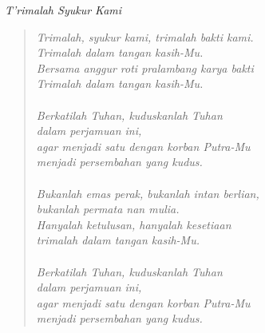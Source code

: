 \small
\begin{center}
\itshape{T’rimalah Syukur Kami}
\end{center}

\begin{verse}
\itshape{
Trimalah, syukur kami, trimalah bakti kami.\\
Trimalah dalam tangan kasih-Mu.\\
Bersama anggur roti pralambang karya bakti\\
Trimalah dalam tangan kasih-Mu.\\
{~}\\
Berkatilah Tuhan, kuduskanlah Tuhan\\
dalam perjamuan ini,\\
agar menjadi satu dengan korban Putra-Mu\\
menjadi persembahan yang kudus.\\
{~}\\
Bukanlah emas perak, bukanlah intan berlian,\\
bukanlah permata nan mulia.\\
Hanyalah ketulusan, hanyalah kesetiaan\\
trimalah dalam tangan kasih-Mu.\\
{~}\\
Berkatilah Tuhan, kuduskanlah Tuhan\\
dalam perjamuan ini,\\
agar menjadi satu dengan korban Putra-Mu\\
menjadi persembahan yang kudus.
}
\end{verse}
\normalsize

